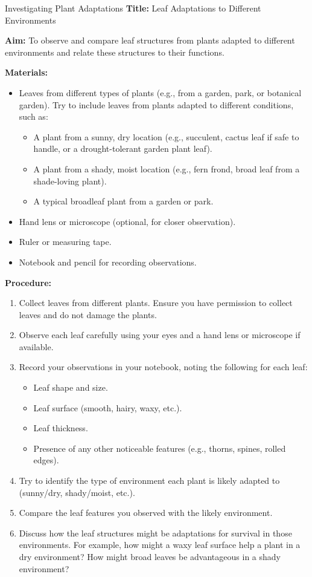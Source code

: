 \begin{investigation}{Investigating Plant Adaptations}
\textbf{Title:}  Leaf Adaptations to Different Environments

\textbf{Aim:} To observe and compare leaf structures from plants adapted to different environments and relate these structures to their functions.

\textbf{Materials:}
\begin{itemize}
    \item Leaves from different types of plants (e.g., from a garden, park, or botanical garden). Try to include leaves from plants adapted to different conditions, such as:
    \begin{itemize}
        \item A plant from a sunny, dry location (e.g., succulent, cactus leaf if safe to handle, or a drought-tolerant garden plant leaf).
        \item A plant from a shady, moist location (e.g., fern frond, broad leaf from a shade-loving plant).
        \item A typical broadleaf plant from a garden or park.
    \end{itemize}
    \item Hand lens or microscope (optional, for closer observation).
    \item Ruler or measuring tape.
    \item Notebook and pencil for recording observations.
\end{itemize}

\textbf{Procedure:}
\begin{enumerate}
    \item Collect leaves from different plants. Ensure you have permission to collect leaves and do not damage the plants.
    \item Observe each leaf carefully using your eyes and a hand lens or microscope if available.
    \item Record your observations in your notebook, noting the following for each leaf:
    \begin{itemize}
        \item Leaf shape and size.
        \item Leaf surface (smooth, hairy, waxy, etc.).
        \item Leaf thickness.
        \item Presence of any other noticeable features (e.g., thorns, spines, rolled edges).
    \end{itemize}
    \item Try to identify the type of environment each plant is likely adapted to (sunny/dry, shady/moist, etc.).
    \item Compare the leaf features you observed with the likely environment.
    \item Discuss how the leaf structures might be adaptations for survival in those environments. For example, how might a waxy leaf surface help a plant in a dry environment? How might broad leaves be advantageous in a shady environment?
\end{enumerate}


\end{investigation}

